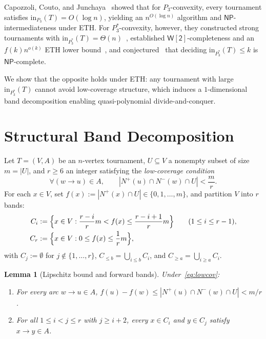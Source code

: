 \documentclass[11pt]{article}
\newtheorem{lemma}[theorem]{Lemma}
\theoremstyle{remark}
\begin{document}
Capozzoli, Couto, and Junchaya~\cite{CCJ2026} showed that for $P_3$-convexity, every tournament satisfies $\mathrm{in}_{P_3}(T) = O(\log n)$, yielding an $n^{O(\log n)}$ algorithm and $\mathsf{NP}$-intermediateness under ETH. For $P_3^*$-convexity, however, they constructed strong tournaments with $\mathrm{in}_{P_3^*}(T) = \Theta(n)$~\cite[Proposition~1]{CCJ2026}, established $\mathsf{W[2]}$-completeness and an $f(k)n^{o(k)}$ ETH lower bound~\cite[Theorem~4.1, Corollary~3]{CCJ2026}, and conjectured~\cite[Conjecture~1]{CCJ2026} that deciding $\mathrm{in}_{P_3^*}(T) \le k$ is $\mathsf{NP}$-complete.

We show that the opposite holds under ETH: any tournament with large $\mathrm{in}_{P_3^*}(T)$ cannot avoid low-coverage structure, which induces a $1$-dimensional band decomposition enabling quasi-polynomial divide-and-conquer.

\section{Structural Band Decomposition}

Let $T = (V, A)$ be an $n$-vertex tournament, $U \subseteq V$ a nonempty subset of size $m = |U|$, and $r \ge 6$ an integer satisfying the \emph{low-coverage condition}
\begin{equation}\label{eq:lowcov}
  \forall (w \to u) \in A, \qquad |N^+(u) \cap N^-(w) \cap U| < \frac{m}{r}.
\end{equation}
For each $x \in V$, set $f(x) := |N^+(x) \cap U| \in \{0, 1, \dots, m\}$, and partition $V$ into $r$ bands:
\begin{align*}
  C_i &:= \Bigl\{x \in V : \frac{r - i}{r} m < f(x) \le \frac{r - i + 1}{r} m\Bigr\} \qquad (1 \le i \le r - 1), \\
  C_r &:= \Bigl\{x \in V : 0 \le f(x) \le \frac{1}{r} m\Bigr\},
\end{align*}
with $C_j := \emptyset$ for $j \notin \{1, \dots, r\}$, $C_{\le b} = \bigcup_{i \le b} C_i$, and $C_{\ge a} = \bigcup_{i \ge a} C_i$.

\begin{lemma}[Lipschitz bound and forward bands]\label{lem:AB}
Under~\eqref{eq:lowcov}:
\begin{enumerate}
  \item[\emph{(A)}] For every arc $w \to u \in A$, $f(u) - f(w) \le |N^+(u) \cap N^-(w) \cap U| < m/r$.
  \item[\emph{(B)}] For all $1 \le i < j \le r$ with $j \ge i + 2$, every $x \in C_i$ and $y \in C_j$ satisfy $x \to y \in A$.
\end{enumerate}
\end{lemma}
\end{document}
